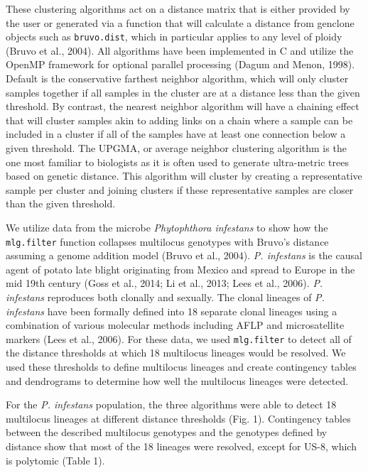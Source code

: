 \documentclass{frontiersSCNS} %
\begin{document}
These clustering algorithms act on a distance matrix that is either
provided by the user or generated via a function that will calculate a
distance from genclone objects such as \texttt{bruvo.dist}, which in
particular applies to any level of ploidy (Bruvo et al., 2004). All
algorithms have been implemented in C and utilize the OpenMP framework
for optional parallel processing (Dagum and Menon, 1998). Default is the
conservative farthest neighbor algorithm, which will only cluster
samples together if all samples in the cluster are at a distance less
than the given threshold. By contrast, the nearest neighbor algorithm
will have a chaining effect that will cluster samples akin to adding
links on a chain where a sample can be included in a cluster if all of
the samples have at least one connection below a given threshold. The
UPGMA, or average neighbor clustering algorithm is the one most familiar
to biologists as it is often used to generate ultra-metric trees based
on genetic distance. This algorithm will cluster by creating a
representative sample per cluster and joining clusters if these
representative samples are closer than the given threshold.

We utilize data from the microbe \emph{Phytophthora infestans} to show
how the \texttt{mlg.filter} function collapses multilocus genotypes with
Bruvo's distance assuming a genome addition model (Bruvo et al., 2004).
\emph{P. infestans} is the causal agent of potato late blight
originating from Mexico and spread to Europe in the mid 19th century
(Goss et al., 2014; Li et al., 2013; Lees et al., 2006). \emph{P.
infestans} reproduces both clonally and sexually. The clonal lineages of
\emph{P. infestans} have been formally defined into 18 separate clonal
lineages using a combination of various molecular methods including AFLP
and microsatellite markers (Lees et al., 2006). For these data, we used
\texttt{mlg.filter} to detect all of the distance thresholds at which 18
multilocus lineages would be resolved. We used these thresholds to
define multilocus lineages and create contingency tables and dendrograms
to determine how well the multilocus lineages were detected.

For the \emph{P. infestans} population, the three algorithms were able
to detect 18 multilocus lineages at different distance thresholds (Fig.
1). Contingency tables between the described multilocus genotypes and
the genotypes defined by distance show that most of the 18 lineages were
resolved, except for US-8, which is polytomic (Table 1).
\end{document}
